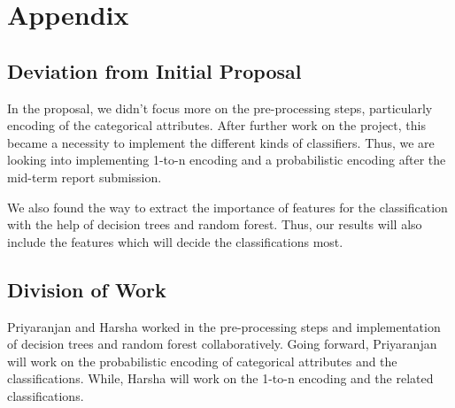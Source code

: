 \documentclass{article} %
\begin{document}
\newpage
\appendix
\section{Appendix} \label{App:Appendix}
	\subsection{Deviation from Initial Proposal}
	In the proposal, we didn't focus more on the pre-processing steps, particularly encoding of the categorical attributes. After further work on the project, this became a necessity to implement the different kinds of classifiers. Thus, we are looking into implementing 1-to-n encoding and a probabilistic encoding after the mid-term report submission.
	
	We also found the way to extract the importance of features for the classification with the help of decision trees and random forest. Thus, our results will also include the features which will decide the classifications most. 
	
	\subsection{Division of Work}
	Priyaranjan and Harsha worked in the pre-processing steps and implementation of decision trees and random forest collaboratively. Going forward, Priyaranjan will work on the probabilistic encoding of categorical attributes and the classifications. While, Harsha will work on the 1-to-n encoding and the related classifications.
\end{document}
